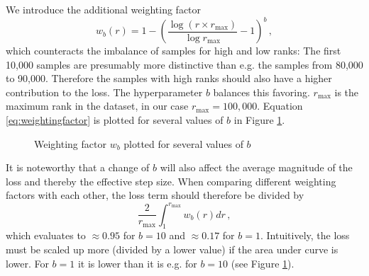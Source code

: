 We introduce the additional weighting factor
\begin{equation}\label{eq:weightingfactor}
    w_b(r)=1-\left(\frac{\log\left(r\times r_\text{max}\right)}{\log r_\text{max}}-1\right)^b\,,
\end{equation}which counteracts the imbalance of samples for high and low ranks: The first 10,000 samples are presumably more distinctive than e.g. the samples from 80,000 to 90,000. Therefore the samples with high ranks should also have a higher contribution to the loss. The hyperparameter $b$ balances this favoring. $r_\text{max}$ is the maximum rank in the dataset, in our case $r_\text{max}=100,000$. Equation \ref{eq:weightingfactor} is plotted for several values of $b$ in Figure \ref{fig:weightingfactor}.

\begin{figure}\centering
    \caption{Weighting factor $w_b$ plotted for several values of $b$}\label{fig:weightingfactor}
\end{figure}

It is noteworthy that a change of $b$ will also affect the average magnitude of the loss and thereby the effective step size. When comparing different weighting factors with each other, the loss term should therefore be divided by
\begin{equation}\label{eq:losswnormalization}
\frac{2}{r_\text{max}}\int_1^{r_\text{max}}w_b(r)dr\,,
\end{equation}
which evaluates to $\approx0.95$ for $b=10$ and $\approx0.17$ for $b=1$. Intuitively, the loss must be scaled up more (divided by a lower value) if the area under curve is lower. For $b=1$ it is lower than it is e.g. for $b=10$ (see Figure \ref{fig:weightingfactor}).

